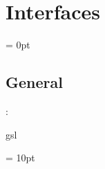 
\section{Interfaces} 


\parskip = 0pt

\vspace{3mm} \subsection*{General}

: 

gsl
\vspace{2mm}

\vspace{5mm}\parskip = 10pt 
